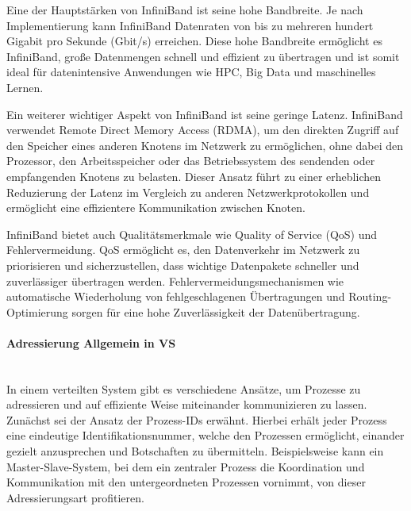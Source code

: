 \documentclass[../vs-script-first-v01.tex]{subfiles}
\begin{document}
Eine der Hauptstärken von InfiniBand ist seine hohe Bandbreite. Je nach Implementierung kann InfiniBand Datenraten von bis zu mehreren hundert Gigabit pro Sekunde (Gbit/s) erreichen. Diese hohe Bandbreite ermöglicht es InfiniBand, große Datenmengen schnell und effizient zu übertragen und ist somit ideal für datenintensive Anwendungen wie HPC, Big Data und maschinelles Lernen.

Ein weiterer wichtiger Aspekt von InfiniBand ist seine geringe Latenz. InfiniBand verwendet Remote Direct Memory Access (RDMA), um den direkten Zugriff auf den Speicher eines anderen Knotens im Netzwerk zu ermöglichen, ohne dabei den Prozessor, den Arbeitsspeicher oder das Betriebssystem des sendenden oder empfangenden Knotens zu belasten. Dieser Ansatz führt zu einer erheblichen Reduzierung der Latenz im Vergleich zu anderen Netzwerkprotokollen und ermöglicht eine effizientere Kommunikation zwischen Knoten.

InfiniBand bietet auch Qualitätsmerkmale wie Quality of Service (QoS) und Fehlervermeidung. QoS ermöglicht es, den Datenverkehr im Netzwerk zu priorisieren und sicherzustellen, dass wichtige Datenpakete schneller und zuverlässiger übertragen werden. Fehlervermeidungsmechanismen wie automatische Wiederholung von fehlgeschlagenen Übertragungen und Routing-Optimierung sorgen für eine hohe Zuverlässigkeit der Datenübertragung.
\paragraph{Adressierung Allgemein in VS}\mbox{}\\
In einem verteilten System gibt es verschiedene Ansätze, um Prozesse zu adressieren und auf effiziente Weise miteinander kommunizieren zu lassen. Zunächst sei der Ansatz der Prozess-IDs erwähnt. Hierbei erhält jeder Prozess eine eindeutige Identifikationsnummer, welche den Prozessen ermöglicht, einander gezielt anzusprechen und Botschaften zu übermitteln. Beispielsweise kann ein Master-Slave-System, bei dem ein zentraler Prozess die Koordination und Kommunikation mit den untergeordneten Prozessen vornimmt, von dieser Adressierungsart profitieren.
\end{document}
